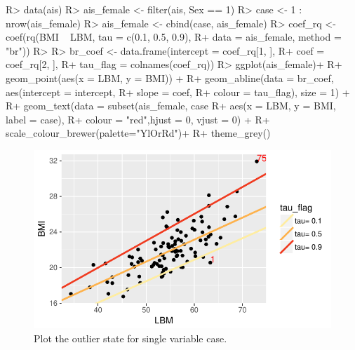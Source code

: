\documentclass[article]{jss}
\theoremstyle{definition}
\theoremstyle{definition}
\theoremstyle{remark}
\begin{document}
\begin{CodeChunk}

\begin{CodeInput}
R> data(ais)
R> ais_female <- filter(ais, Sex == 1)
R> case <- 1 : nrow(ais_female)
R> ais_female <- cbind(case, ais_female)
R> coef_rq <- coef(rq(BMI ~ LBM, tau = c(0.1, 0.5, 0.9),
R+                    data = ais_female, method = "br"))
R> 
R> br_coef <- data.frame(intercept = coef_rq[1, ],
R+                       coef = coef_rq[2, ],
R+                       tau_flag = colnames(coef_rq))
R> ggplot(ais_female)+
R+   geom_point(aes(x = LBM, y = BMI)) +
R+   geom_abline(data = br_coef, aes(intercept = intercept,
R+                                   slope = coef,
R+                                   colour = tau_flag), size = 1) +
R+   geom_text(data = subset(ais_female, case %
R+                           aes(x = LBM, y = BMI, label = case), 
R+             colour = "red",hjust = 0, vjust = 0) +
R+   scale_colour_brewer(palette="YlOrRd")+
R+   theme_grey()
\end{CodeInput}
\begin{figure}

{\centering \includegraphics{Diagnosing_outliers_and_visualization_of_quantile_regression_models_files/figure-latex/single-case-1} 

}

\caption[Plot the outlier state for single variable case]{Plot the outlier state for single variable case.}\label{fig:single-case}
\end{figure}
\end{CodeChunk}
\end{document}
